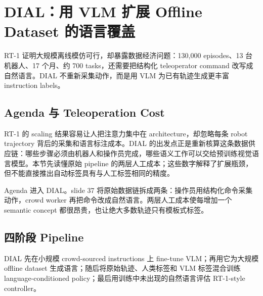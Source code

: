 \section{DIAL：用 VLM 扩展 Offline Dataset 的语言覆盖}

RT-1 证明大规模离线模仿可行，却暴露数据经济问题：130,000 episodes、13 台机器人、17 个月、约 700 tasks，还需要把结构化 teleoperator command 改写成自然语言。DIAL 不重新采集动作，而是用 VLM 为已有轨迹生成更丰富 instruction labels。

\subsection{Agenda 与 Teleoperation Cost}

RT-1 的 scaling 结果容易让人把注意力集中在 architecture，却忽略每条 robot trajectory 背后的采集和语言标注成本。DIAL 的出发点正是重新核算这条数据供应链：哪些步骤必须由机器人和操作员完成，哪些语义工作可以交给预训练视觉语言模型。本节先读懂原始 pipeline 的两层人工成本；这些数字解释了扩展瓶颈，但不能直接推出自动标签具有与人工标签相同的精度。

Agenda 进入 DIAL。slide 37 将原始数据链拆成两条：操作员用结构化命令采集动作，crowd worker 再把命令改成自然语言。两层人工成本使每增加一个 semantic concept 都很昂贵，也让绝大多数轨迹只有模板式标签。




\subsection{四阶段 Pipeline}

DIAL 先在小规模 crowd-sourced instructions 上 fine-tune VLM；再用它为大规模 offline dataset 生成语言；随后将原始轨迹、人类标签和 VLM 标签混合训练 language-conditioned policy；最后用训练中未出现的自然语言评估 RT-1-style controller。


